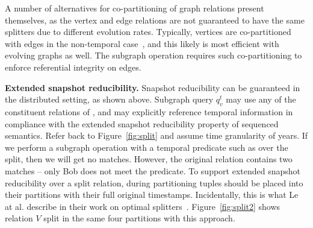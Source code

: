 A number of alternatives for co-partitioning of graph relations
present themselves, as the vertex and edge relations are not
guaranteed to have the same splitters due to different evolution
rates.  Typically, vertices are co-partitioned with edges in the
non-temporal case~\cite{DBLP:conf/osdi/GonzalezXDCFS14}, and this
likely is most efficient with evolving graphs as well.  The subgraph
operation requires such co-partitioning to enforce referential
integrity on edges.




{\bf Extended snapshot reducibility.}  Snapshot reducibility can be
guaranteed in the distributed setting, as shown above.  Subgraph query $q^t_v$ may use any of the constituent
relations of \tve, and may explicitly reference temporal information
in compliance with the extended snapshot reducibility property of
sequenced semantics.  Refer back to Figure~\ref{fig:split} and assume
time granularity of years.  If we perform a subgraph operation with a
temporal predicate such as  over the split, then we
will get no matches.  However, the original relation contains two
matches -- only Bob does not meet the
predicate.  To support extended snapshot reducibility over a split
relation, during partitioning tuples should be placed into their
partitions with their full original timestamps.  Incidentally, this is
what Le at al. describe in their work on optimal
splitters~\cite{Le2013}.  Figure~\ref{fig:split2} shows relation $V$
split in the same four partitions with this approach.


